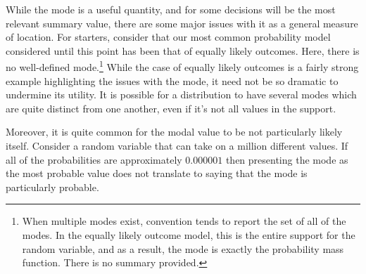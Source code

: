 \documentclass[
  letterpaper,
  DIV=11,
  numbers=noendperiod]{scrreprt}
\theoremstyle{definition}
\theoremstyle{definition}
\theoremstyle{definition}
\theoremstyle{remark}
\begin{document}
While the mode is a useful quantity, and for some decisions will be the
most relevant summary value, there are some major issues with it as a
general measure of location. For starters, consider that our most common
probability model considered until this point has been that of equally
likely outcomes. Here, there is no well-defined mode.\footnote{When
  multiple modes exist, convention tends to report the set of all of the
  modes. In the equally likely outcome model, this is the entire support
  for the random variable, and as a result, the mode is exactly the
  probability mass function. There is no summary provided.} While the
case of equally likely outcomes is a fairly strong example highlighting
the issues with the mode, it need not be so dramatic to undermine its
utility. It is possible for a distribution to have several modes which
are quite distinct from one another, even if it's not all values in the
support.

Moreover, it is quite common for the modal value to be not particularly
likely itself. Consider a random variable that can take on a million
different values. If all of the probabilities are approximately
\(0.000001\) then presenting the mode as the most probable value does
not translate to saying that the mode is particularly probable.
\end{document}
